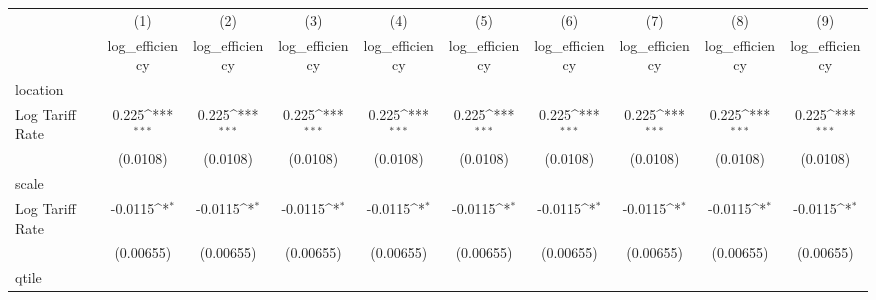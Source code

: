 {
\def\sym#1{\ifmmode^{#1}\else\(^{#1}\)\fi}
\begin{tabular}{l*{9}{c}}
\hline\hline
                    &\multicolumn{1}{c}{(1)}&\multicolumn{1}{c}{(2)}&\multicolumn{1}{c}{(3)}&\multicolumn{1}{c}{(4)}&\multicolumn{1}{c}{(5)}&\multicolumn{1}{c}{(6)}&\multicolumn{1}{c}{(7)}&\multicolumn{1}{c}{(8)}&\multicolumn{1}{c}{(9)}\\
                    &\multicolumn{1}{c}{log\_efficiency}&\multicolumn{1}{c}{log\_efficiency}&\multicolumn{1}{c}{log\_efficiency}&\multicolumn{1}{c}{log\_efficiency}&\multicolumn{1}{c}{log\_efficiency}&\multicolumn{1}{c}{log\_efficiency}&\multicolumn{1}{c}{log\_efficiency}&\multicolumn{1}{c}{log\_efficiency}&\multicolumn{1}{c}{log\_efficiency}\\
\hline
location            &                     &                     &                     &                     &                     &                     &                     &                     &                     \\
Log Tariff Rate     &       0.225\sym{***}&       0.225\sym{***}&       0.225\sym{***}&       0.225\sym{***}&       0.225\sym{***}&       0.225\sym{***}&       0.225\sym{***}&       0.225\sym{***}&       0.225\sym{***}\\
                    &    (0.0108)         &    (0.0108)         &    (0.0108)         &    (0.0108)         &    (0.0108)         &    (0.0108)         &    (0.0108)         &    (0.0108)         &    (0.0108)         \\
\hline
scale               &                     &                     &                     &                     &                     &                     &                     &                     &                     \\
Log Tariff Rate     &     -0.0115\sym{*}  &     -0.0115\sym{*}  &     -0.0115\sym{*}  &     -0.0115\sym{*}  &     -0.0115\sym{*}  &     -0.0115\sym{*}  &     -0.0115\sym{*}  &     -0.0115\sym{*}  &     -0.0115\sym{*}  \\
                    &   (0.00655)         &   (0.00655)         &   (0.00655)         &   (0.00655)         &   (0.00655)         &   (0.00655)         &   (0.00655)         &   (0.00655)         &   (0.00655)         \\
\hline
qtile               &                     &                     &                     &                     &                     &                     &                     &                     &                     \\

\end{tabular}}
